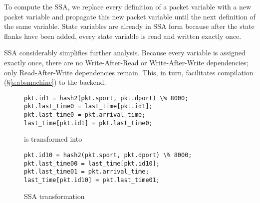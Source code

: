 To compute the SSA, we replace every definition of a packet variable with a new
packet variable and propagate this new packet variable until the next
definition of the same variable. State variables are already in SSA form
because after the state flanks have been added, every state variable is read
and written exactly once.

SSA considerably simplifies further analysis. Because every variable is
assigned exactly once, there are no Write-After-Read or Write-After-Write
dependencies; only Read-After-Write dependencies remain. This, in turn,
facilitates compilation (\S\ref{s:absmachine}) to the backend.
\begin{figure}
\begin{tiny}
\begin{lstlisting}
pkt.id1 = hash2(pkt.sport, pkt.dport) \% 8000;
pkt.last_time0 = last_time[pkt.id1];
pkt.last_time0 = pkt.arrival_time;
last_time[pkt.id1] = pkt.last_time0;
\end{lstlisting}
\end{tiny}
\begin{center}
is transformed into
\end{center}
\begin{tiny}
\begin{lstlisting}
pkt.id10 = hash2(pkt.sport, pkt.dport) \% 8000;
pkt.last_time00 = last_time[pkt.id10];
pkt.last_time01 = pkt.arrival_time;
last_time[pkt.id10] = pkt.last_time01;
\end{lstlisting}
\end{tiny}
\caption{SSA transformation}
\label{fig:stateful_flanks}
\end{figure}

